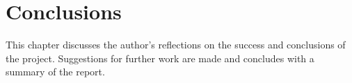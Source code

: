 \chapter{Conclusions}
\label{cha:conclusion}
This chapter discusses the author's reflections on the success and conclusions of the project. Suggestions for further work are made and concludes with a summary of the report. 


